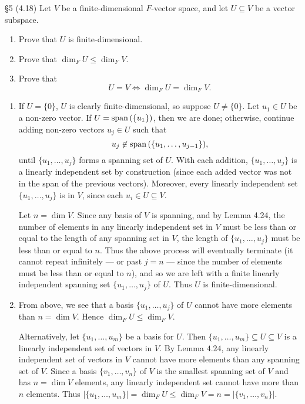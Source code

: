 \documentclass{homework}
\begin{document}
\begin{problem}{\S 5}
  (4.18) Let $V$ be a finite-dimensional $F$-vector space, and let $U\subseteq V$ be a vector
  subspace.
  \begin{enumerate}[label=(\alph*)]
    \item Prove that $U$ is finite-dimensional.
    \item Prove that $\dim_F{U}\le \dim_F{V}$.
    \item Prove that \[
      U=V \iff \dim_F{U}=\dim_F{V}
    .\] 
  \end{enumerate}
\end{problem}
\begin{solution}
  \begin{enumerate}[label=(\alph*)]
    \item If $U=\{ 0 \}$, $U$ is clearly finite-dimensional, so suppose $U\neq \{ 0 \}$. Let $u_1\in
      U$ be a non-zero vector. If $U=\operatorname{span}{(\{ u_1 \})}$, then we are done; otherwise, continue adding
      non-zero vectors $u_j\in U$ such that \[
        u_j\not\in \operatorname{span}{(\{ u_1,\ldots,u_{j-1} \})}
      ,\] until $\{ u_1,\ldots,u_j \}$ forms a spanning set of $U$. With each addition,
      $\{u_1,\ldots,u_j \}$ is a linearly independent set by construction (since each added vector
      was not in the span of the previous vectors). Moreover, every linearly independent set $\{
      u_1,\ldots,u_j \}$ is in $V$, since each $u_i\in U\subseteq V$.

      Let $n=\dim{V}$. Since any basis of $V$ is spanning, and by Lemma 4.24, the number of elements
      in any linearly independent set in $V$ must be less than or equal to the length of any
      spanning set in $V$, the length of $\{ u_1,\ldots,u_j \}$ must be less than or equal to $n$.
      Thus the above process will eventually terminate (it cannot repeat infinitely --- or past $j=n$
      --- since the number of elements must be less than or equal to $n$), and so we are left with a
      finite linearly independent spanning set $\{ u_1,\ldots,u_j \} $ of $U$. Thus $U$ is
      finite-dimensional.

    \item From above, we see that a basis $\{ u_1,\ldots,u_j \}$ of $U$ cannot have more elements
      than $n=\dim{V}$. Hence $\dim_F{U}\le \dim_F{V}$.

      Alternatively, let $\{ u_1,\ldots,u_m \}$ be a basis for $U$. Then $\{ u_1,\ldots,u_m
      \}\subseteq U\subseteq V$ is a linearly independent set of vectors in $V$. By Lemma $4.24$,
      any linearly independent set of vectors in $V$ cannot have more elements than any spanning set
      of $V$. Since a basis $\{ v_1,\ldots,v_n \}$ of $V$ is the smallest spanning set of $V$ and
      has $n=\dim{V}$ elements, any linearly independent set cannot have more than $n$ elements.
      Thus $\left| \{ u_1,\ldots,u_m \} \right| =\dim_F{U}\le \dim_F{V}=n=\left| \{ v_1,\ldots,v_n
      \} \right| $.


\end{enumerate}
\end{solution}
\end{document}
